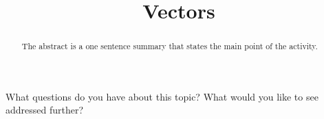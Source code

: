 \documentclass{ximera}
\title{Vectors}
\begin{document}
\begin{abstract}
  The abstract is a one sentence summary that states the main point of the activity.
\end{abstract}

\maketitle



What questions do you have about this topic?  What would you like to see addressed further?
\begin{free-response}
\end{free-response}
\end{document}
